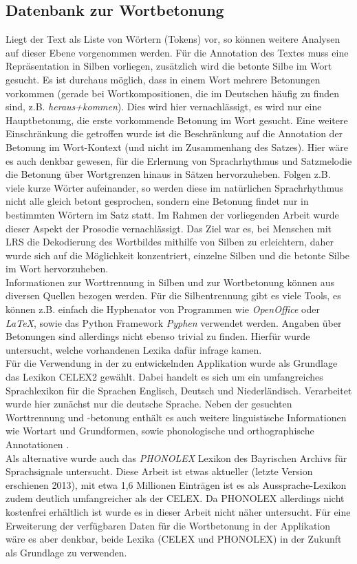 \subsection{Datenbank zur Wortbetonung}
\label{sec:forschung-database}

Liegt der Text als Liste von Wörtern (Tokens) vor, so können weitere Analysen auf dieser Ebene vorgenommen werden. Für die Annotation des Textes muss eine Repräsentation in Silben vorliegen, zusätzlich wird die betonte Silbe im Wort gesucht. Es ist durchaus möglich, dass in einem Wort mehrere Betonungen vorkommen (gerade bei Wortkompositionen, die im Deutschen häufig zu finden sind, z.B. \textit{heraus+kommen}). Dies wird hier vernachlässigt, es wird nur eine Hauptbetonung, die erste vorkommende Betonung im Wort gesucht. Eine weitere Einschränkung die getroffen wurde ist die Beschränkung auf die Annotation der Betonung im Wort-Kontext (und nicht im Zusammenhang des Satzes). Hier wäre es auch denkbar gewesen, für die Erlernung von Sprachrhythmus und Satzmelodie die Betonung über Wortgrenzen hinaus in Sätzen hervorzuheben. Folgen z.B. viele kurze Wörter aufeinander, so werden diese im natürlichen Sprachrhythmus nicht alle gleich betont gesprochen, sondern eine Betonung findet nur in bestimmten Wörtern im Satz statt. Im Rahmen der vorliegenden Arbeit wurde dieser Aspekt der Prosodie vernachlässigt. Das Ziel war es, bei Menschen mit LRS die Dekodierung des Wortbildes mithilfe von Silben zu erleichtern, daher wurde sich auf die Möglichkeit konzentriert, einzelne Silben und die betonte Silbe im Wort hervorzuheben.\\

Informationen zur Worttrennung in Silben und zur Wortbetonung können aus diversen Quellen bezogen werden. Für die Silbentrennung gibt es viele Tools, es können z.B. einfach die Hyphenator von Programmen wie \textit{OpenOffice} oder \textit{LaTeX}, sowie das Python Framework \textit{Pyphen} verwendet werden. Angaben über Betonungen sind allerdings nicht ebenso trivial zu finden. Hierfür wurde untersucht, welche vorhandenen Lexika dafür infrage kamen.\\
Für die Verwendung in der zu entwickelnden Applikation wurde als Grundlage das Lexikon CELEX2 gewählt. Dabei handelt es sich um ein umfangreiches Sprachlexikon für die Sprachen Englisch, Deutsch und Niederländisch. Verarbeitet wurde hier zunächst nur die deutsche Sprache. Neben der gesuchten Worttrennung und -betonung enthält es auch weitere linguistische Informationen wie Wortart und Grundformen, sowie phonologische und orthographische Annotationen \cite{Burnage1990}.\\
Als alternative wurde auch das \textit{PHONOLEX} Lexikon des Bayrischen Archivs für Sprachsignale\cite{phonolex} untersucht. Diese Arbeit ist etwas aktueller (letzte Version erschienen 2013), mit etwa 1,6 Millionen Einträgen ist es als Aussprache-Lexikon zudem deutlich umfangreicher als der CELEX\cite{Schiel1999}. Da PHONOLEX allerdings nicht kostenfrei erhältlich ist wurde es in dieser Arbeit nicht näher untersucht. Für eine Erweiterung der verfügbaren Daten für die Wortbetonung in der Applikation wäre es aber denkbar, beide Lexika (CELEX und PHONOLEX) in der Zukunft als Grundlage zu verwenden.\\

